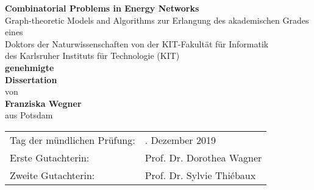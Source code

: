 \begin{titlepage}
  \sffamily
  \begin{center}
    \hfill \vfil \bigskip
    \LARGE\textbf{Combinatorial Problems in Energy Networks}\\
    Graph-theoretic Models and Algorithms
    \vfil%
    \large zur Erlangung des akademischen Grades eines \\
    \bigskip
    \Large Doktors der Naturwissenschaften \vfil
    \large von der KIT-Fakultät für Informatik\\
    des Karlsruher Instituts für Technologie (KIT)\\
    \bigskip\bigskip
    \textbf{genehmigte} \\
    \medskip
    \Large \textbf{Dissertation} \\
    \bigskip
    \large von \\
    \bigskip \Large \textbf{Franziska Wegner}\\ %
    \bigskip \large aus Potsdam %
  \end{center}

  \vfil \large
  \begin{table}[h]
    \centering
    \large
    \begin{tabular}{ll}
      \sffamily Tag der mündlichen Prüfung: & \sffamily 12. Dezember 2019\\
      \sffamily Erste Gutachterin:          & \sffamily Prof. Dr. Dorothea Wagner\\
      \sffamily Zweite Gutachterin:          & \sffamily Prof. Dr. Sylvie
      Thi\'ebaux
    \end{tabular}
  \end{table}
\end{titlepage}

\restoregeometry

